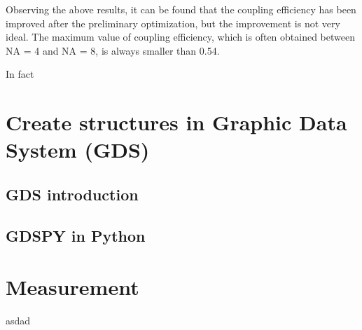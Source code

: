 \documentclass[]{article}
\begin{document}
Observing the above results, it can be found that the coupling efficiency has been improved after the preliminary optimization, but the improvement is not very ideal. The maximum value of coupling efficiency, which is often obtained between NA = 4 and NA = 8, is always smaller than 0.54.


In fact

\section{Create structures in Graphic Data System (GDS)}


\subsection{GDS introduction}

\subsection{GDSPY in Python}

\section{Measurement}

\newpage

\begin{thebibliography}{99}
asdad
\end{thebibliography}
\end{document}
